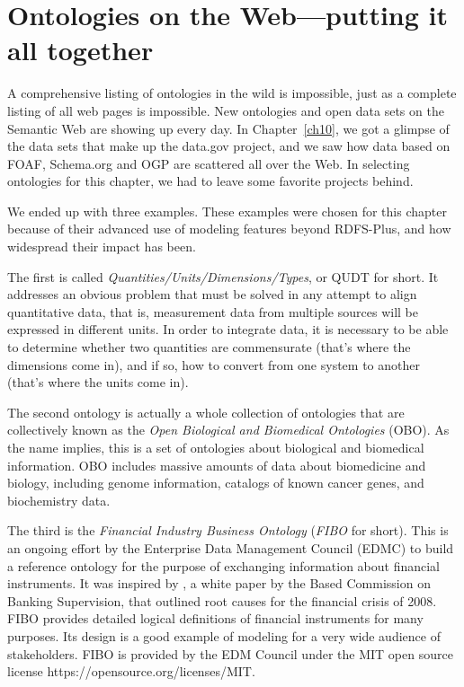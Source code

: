 \chapter{Ontologies on the Web---putting it all together}
\label{ch14}

A comprehensive listing of ontologies in the wild is impossible, just as
a complete listing of all web pages is impossible. New ontologies and
open data sets on the Semantic Web are showing up every day. In Chapter~\ref{ch10}, we got a glimpse of the data sets that make up the data.gov project,
and we saw how data based on FOAF, Schema.org and OGP are scattered all over the
Web. In selecting ontologies for this chapter, we had to leave some
favorite projects behind.

We ended up with three examples. These examples were chosen for this
chapter because of their advanced use of modeling features beyond
RDFS-Plus, and how widespread their impact has been.


The first is called \emph{Quantities/Units/Dimensions/Types}, or QUDT for
short. It addresses an obvious problem that must be solved in any
attempt to align quantitative data, that is, measurement data from
multiple sources will be expressed in different units. In order to
integrate data, it is necessary to be able to determine whether two
quantities are commensurate (that's where the dimensions come in), and
if so, how to convert from one system to another (that's where the units
come in).

The second ontology is actually a whole collection of ontologies that are
collectively known as the \emph{Open Biological and Biomedical Ontologies}
(OBO). As the name implies, this is a set of ontologies about biological
and biomedical information.  OBO includes
massive amounts of data about biomedicine and biology, including genome
information, catalogs of known cancer genes, and biochemistry data.


The third is the \emph{Financial Industry Business Ontology} (\emph{FIBO} for short).
This is an ongoing effort by the Enterprise Data Management Council (EDMC) to 
build a reference ontology for the purpose of exchanging information about 
financial instruments.  It was inspired by
\cite{basel2013principles}, a white paper by the Based Commission 
on Banking Supervision, that outlined root causes for the financial crisis of
2008.  FIBO provides detailed logical definitions of financial instruments
for many purposes.  Its design is a good example of modeling for a very wide
audience of stakeholders.  FIBO is provided by the EDM Council under the MIT open source license https://opensource.org/licenses/MIT. 


